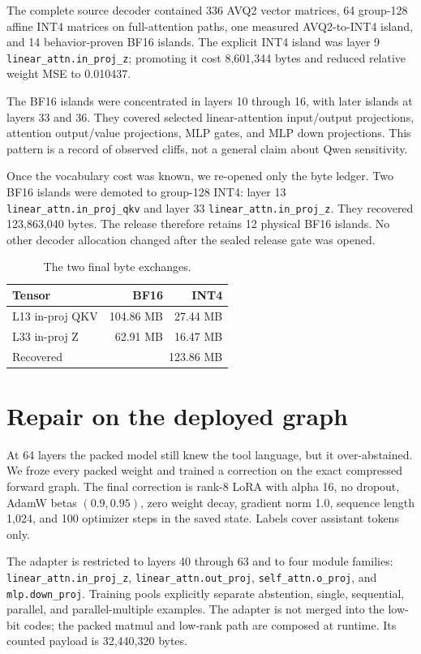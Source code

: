 \documentclass[10pt,twocolumn]{article}
\newcommand{\code}[1]{\texttt{#1}}
\begin{document}
The complete source decoder contained 336 AVQ2 vector matrices, 64 group-128 affine INT4 matrices on full-attention paths, one measured AVQ2-to-INT4 island, and 14 behavior-proven BF16 islands. The explicit INT4 island was layer 9 \code{linear\_attn.in\_proj\_z}; promoting it cost 8,601,344 bytes and reduced relative weight MSE to 0.010437.

The BF16 islands were concentrated in layers 10 through 16, with later islands at layers 33 and 36. They covered selected linear-attention input/output projections, attention output/value projections, MLP gates, and MLP down projections. This pattern is a record of observed cliffs, not a general claim about Qwen sensitivity.

Once the vocabulary cost was known, we re-opened only the byte ledger. Two BF16 islands were demoted to group-128 INT4: layer 13 \code{linear\_attn.in\_proj\_qkv} and layer 33 \code{linear\_attn.in\_proj\_z}. They recovered 123,863,040 bytes. The release therefore retains 12 physical BF16 islands. No other decoder allocation changed after the sealed release gate was opened.

\begin{table}[t]
\centering
\small
\caption{The two final byte exchanges.}
\begin{tabularx}{\columnwidth}{@{}Xrr@{}}
\toprule
Tensor & BF16 & INT4 \\
\midrule
L13 in-proj QKV & 104.86 MB & 27.44 MB \\
L33 in-proj Z & 62.91 MB & 16.47 MB \\
\midrule
Recovered & \multicolumn{2}{r}{123.86 MB} \\
\bottomrule
\end{tabularx}
\end{table}

\section{Repair on the deployed graph}

At 64 layers the packed model still knew the tool language, but it over-abstained. We froze every packed weight and trained a correction on the exact compressed forward graph. The final correction is rank-8 LoRA with alpha 16, no dropout, AdamW betas $(0.9,0.95)$, zero weight decay, gradient norm 1.0, sequence length 1,024, and 100 optimizer steps in the saved state. Labels cover assistant tokens only.

The adapter is restricted to layers 40 through 63 and to four module families: \code{linear\_attn.in\_proj\_z}, \code{linear\_attn.out\_proj}, \code{self\_attn.o\_proj}, and \code{mlp.down\_proj}. Training pools explicitly separate abstention, single, sequential, parallel, and parallel-multiple examples. The adapter is not merged into the low-bit codes; the packed matmul and low-rank path are composed at runtime. Its counted payload is 32,440,320 bytes.
\end{document}
